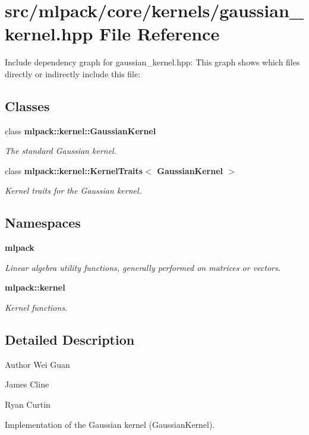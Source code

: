 \section{src/mlpack/core/kernels/gaussian\-\_\-kernel.hpp File Reference}
\label{gaussian__kernel_8hpp}
Include dependency graph for gaussian\-\_\-kernel.\-hpp\-:
This graph shows which files directly or indirectly include this file\-:
\subsection*{Classes}
\begin{DoxyCompactItemize}
\item 
class {\bf mlpack\-::kernel\-::\-Gaussian\-Kernel}
\begin{DoxyCompactList}\small\item\em The standard Gaussian kernel. \end{DoxyCompactList}\item 
class {\bf mlpack\-::kernel\-::\-Kernel\-Traits$<$ Gaussian\-Kernel $>$}
\begin{DoxyCompactList}\small\item\em Kernel traits for the Gaussian kernel. \end{DoxyCompactList}\end{DoxyCompactItemize}
\subsection*{Namespaces}
\begin{DoxyCompactItemize}
\item 
{\bf mlpack}
\begin{DoxyCompactList}\small\item\em Linear algebra utility functions, generally performed on matrices or vectors. \end{DoxyCompactList}\item 
{\bf mlpack\-::kernel}
\begin{DoxyCompactList}\small\item\em Kernel functions. \end{DoxyCompactList}\end{DoxyCompactItemize}


\subsection{Detailed Description}
\begin{DoxyAuthor}{Author}
Wei Guan 

James Cline 

Ryan Curtin
\end{DoxyAuthor}
Implementation of the Gaussian kernel (Gaussian\-Kernel).


